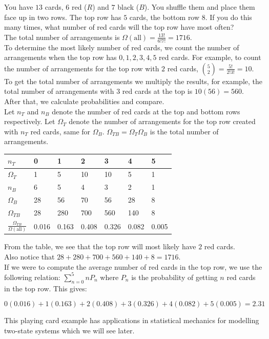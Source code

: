 \documentclass[12pt, a4paper]{article}
\newcounter{exa}
\begin{document}
\begin{texample}
You have $13$ cards, $6$ red ($R$) and $7$ black ($B$). You shuffle them and place them face up in two rows. The top row has $5$ cards, the bottom row $8$. If you do this many times, what number of red cards will the top row have most often? \\

The total number of arrangements is $\Omega(\text{all})=\frac{13!}{6!7!}=1716$. \\

To determine the most likely number of red cards, we count the number of arrangements when the top row has $0, 1, 2, 3, 4, 5$ red cards. For example, to count the number of arrangements for the top row with $2$ red cards, $\binom{5}{2}=\frac{5!}{2!3!}=10$. To get the total number of arrangements we multiply the results, for example, the total number of arrangements with $3$ red cards at the top is $10(56)=560$. After that, we calculate probabilities and compare. \\

Let $n_T$ and $n_B$ denote the number of red cards at the top and bottom rows respectively. Let $\Omega_T$ denote the number of arrangements for the top row created with $n_T$ red cards, same for $\Omega_B$. $\Omega_{TB}=\Omega_T\Omega_B$ is the total number of arrangements.

\begin{center}
\begin{tabular}{l|l|l|l|l|l|l}
  $n_T$ & 0 & 1 & 2 & 3 & 4 & 5 \\
  \hline
  $\Omega_T$ & 1 & 5 & 10 & 10 & 5 & 1 \\
  \hline
  $n_B$ & 6 & 5 & 4 & 3 & 2 & 1 \\
  \hline
  $\Omega_B$ & 28 & 56 & 70 & 56 & 28 & 8 \\
  \hline
  $\Omega_{TB}$ & 28 & 280 & 700 & 560 & 140 & 8 \\
  \hline
  $\frac{\Omega_{TB}}{\Omega(\text{all})}$ & 0.016 & 0.163 & 0.408 & 0.326 & 0.082 & 0.005
\end{tabular}
\end{center}

From the table, we see that the top row will most likely have $2$ red cards. \\

Also notice that $28+280+700+560+140+8=1716$. \\

If we were to compute the average number of red cards in the top row, we use the following relation: $\sum_{n=0}^5 nP_n$ where $P_n$ is the probability of getting $n$ red cards in the top row. This gives:

$$0(0.016) + 1(0.163) + 2(0.408) + 3(0.326) + 4(0.082) + 5(0.005)=2.31$$

This playing card example has applications in statistical mechanics for modelling two-state systems which we will see later.
\end{texample}
\end{document}
